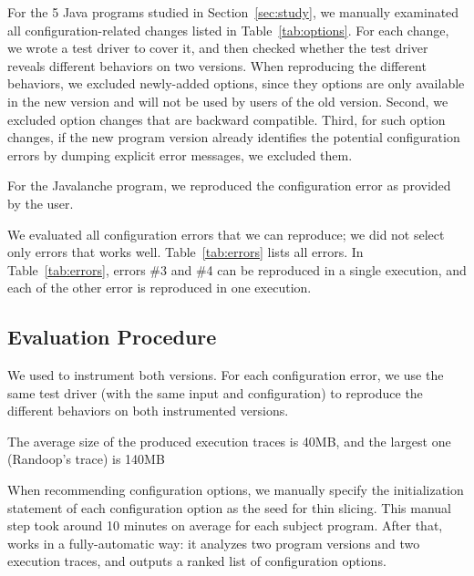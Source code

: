 

For the 5 Java programs studied in Section~\ref{sec:study},
we manually examinated all configuration-related changes
listed in Table~\ref{tab:options}. For each
change, we wrote a test driver to cover
it, and then checked whether the test driver
reveals different behaviors on two versions.
When reproducing the different behaviors,
we excluded newly-added options, since
they options are only available in the new version
and will not be used by users of the old version.
Second, we excluded option changes that are backward
compatible. Third, for such option changes, if the
new program version already identifies the potential
configuration errors by dumping explicit error messages,
we excluded them. 

For the Javalanche program, we reproduced the configuration
error as provided by the user.

We evaluated all configuration errors that we can reproduce;
we did not select only errors that \ourtool works well.
Table~\ref{tab:errors} lists all errors.
In Table~\ref{tab:errors}, errors \#3 and \#4
can be reproduced in a single execution, and each of the other
error is reproduced in one execution.




\subsection{Evaluation Procedure}

We used \ourtool to instrument both versions. 
For each configuration error, we use the same test driver
(with the same input and configuration)
to reproduce the different behaviors on both instrumented versions.

The average size of the produced execution traces is 40MB,
and the largest one (Randoop's trace) is 140MB



When recommending configuration options, we manually specify
the initialization statement of each configuration option as
the seed for thin slicing. This manual step took around
10 minutes on average for each subject program. After that,
\ourtool works in a fully-automatic way: it 
analyzes two program versions and two execution traces,
and outputs a ranked list of configuration options.

